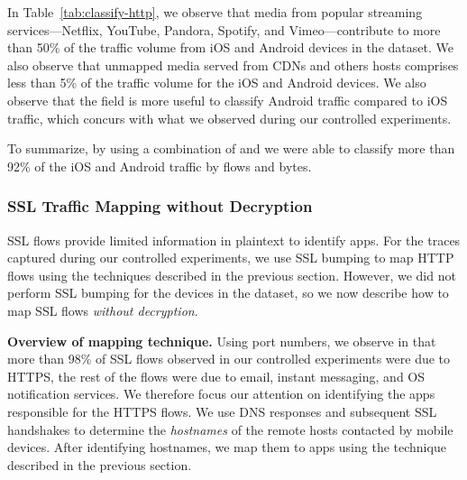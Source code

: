 In Table~\ref{tab:classify-http}, we observe that media from popular streaming services---Netflix, YouTube, Pandora, Spotify, and Vimeo---contribute to more than 50\% of the traffic volume from iOS and Android devices in the \mobWild dataset.
We also observe that unmapped media served from CDNs and others hosts comprises less than 5\% of the traffic volume for the iOS and Android devices. 
We also observe that the \httphost field is more useful to classify Android traffic compared to iOS traffic, which concurs with what we observed during our controlled experiments. 

To summarize, by using a combination of \useragent and \httphost we were able to classify more than 92\% of the iOS and Android traffic by flows and bytes. 

\subsubsection{SSL Traffic Mapping without Decryption}

SSL flows provide limited information in plaintext to identify apps. 
For the traces captured during our controlled experiments, we use SSL bumping to map HTTP flows using the techniques described in the previous section. 
However, we did not perform SSL bumping for the devices in the \mobWild dataset, so we now describe how to 
map SSL flows \emph{without decryption}. 

\noindent\textbf{Overview of mapping technique.}
Using port numbers, we observe in that more than 98\% of SSL flows observed in our controlled experiments were due to HTTPS, the rest of the flows were due to email, instant messaging, and OS notification services. 
We therefore focus our attention on identifying the apps responsible for the HTTPS flows.
We use DNS responses and subsequent SSL handshakes to determine the \emph{hostnames} of the remote hosts contacted by mobile devices.
After identifying hostnames, we map them to apps using the technique described in the previous section.



